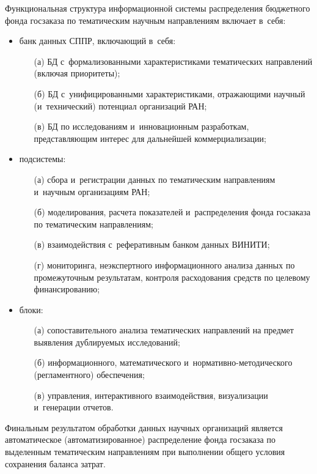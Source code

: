 \begin{multicols}{2}
    Функциональная структура информационной сис\-те\-мы распределения 
бюджетного фонда госзаказа по тематическим научным на\-прав\-ле\-ни\-ям 
включает в~себя: 
    \begin{itemize}
\item  банк данных СППР, включающий в~себя:
\begin{itemize}
\item[(а)] БД с~формализованными 
характеристиками тематических направлений (включая приоритеты); 
\item[(б)] БД 
с~унифицированными характеристиками, отражающими научный 
(и~технический) потенциал организаций РАН; 
\item[(в)] БД по исследованиям 
и~инновационным разработкам, пред\-став\-ля\-ющим интерес для дальнейшей 
коммерциализации;
\end{itemize}
    \item  подсистемы: 
    \begin{itemize}
    \item[(а)] сбора и~регистрации данных по тематическим 
на\-прав\-ле\-ни\-ям и~научным организациям РАН; 
\item[(б)] моделирования, расчета 
показателей и~распределения фонда госзаказа по тематическим на\-прав\-ле\-ни\-ям; 
\item[(в)] взаимодействия с~реферативным банком данных \mbox{ВИНИТИ}; 
\item[(г)] мониторинга, 
неэкспертного информационного анализа данных по промежуточным 
результатам, контроля расходования средств по целевому финансированию;
\end{itemize}
\item  блоки: 
\begin{itemize}
\item[(а)] сопоставительного анализа тематических на\-прав\-ле\-ний на 
предмет выявления дублируемых исследований;
\item[(б)] информационного, 
математического и~нор\-ма\-тив\-но-ме\-то\-ди\-че\-ско\-го (регламентного) 
обеспечения; 
\item[(в)] управ\-ле\-ния, интерактивного взаимодействия, визуализации 
и~генерации отчетов. 
\end{itemize}
\end{itemize}
    
    Финальным результатом обработки данных научных организаций является 
автоматическое (автоматизированное) распределение фонда госзаказа по 
выделенным тематическим на\-прав\-ле\-ни\-ям при выполнении общего условия 
сохранения баланса затрат.
    

\end{multicols}
